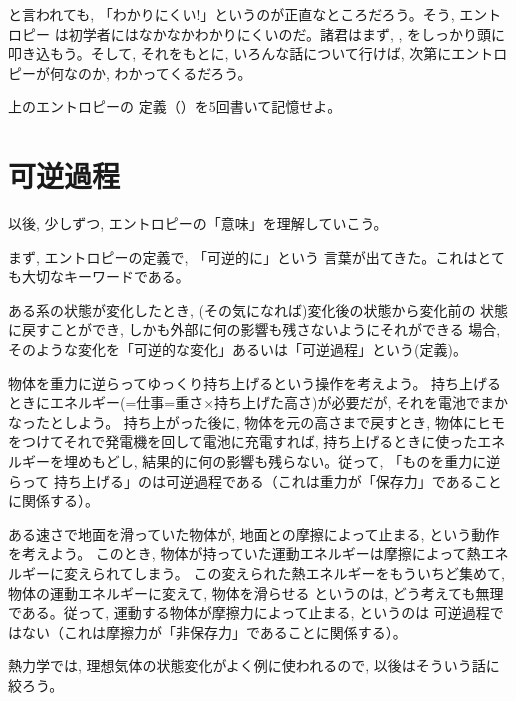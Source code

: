 と言われても, 「わかりにくい!」というのが正直なところだろう。そう, エントロピー
は初学者にはなかなかわかりにくいのだ。諸君はまず, , 
をしっかり頭に叩き込もう。そして, それをもとに, いろんな話について行けば, 
次第にエントロピーが何なのか, わかってくるだろう。
\hv

\begin{q}\label{q:def_enthalpy} 上のエントロピーの
定義（）を5回書いて記憶せよ。\end{q}\mv


\section{可逆過程}

以後, 少しずつ, エントロピーの「意味」を理解していこう。

まず, エントロピーの定義で, 「可逆的に」という
言葉が出てきた。これはとても大切なキーワードである。

ある系の状態が変化したとき, (その気になれば)変化後の状態から変化前の
状態に戻すことができ, しかも外部に何の影響も残さないようにそれができる
場合, そのような変化を「可逆的な変化」あるいは「可逆過程」という(定義)。

\begin{exmpl}\label{exmpl:lift_reverse} 物体を重力に逆らってゆっくり持ち上げるという操作を考えよう。
持ち上げるときにエネルギー(=仕事=重さ×持ち上げた高さ)が必要だが, それを電池でまかなったとしよう。
持ち上がった後に, 物体を元の高さまで戻すとき, 物体にヒモをつけてそれで発電機を回して電池に充電すれば, 
持ち上げるときに使ったエネルギーを埋めもどし, 結果的に何の影響も残らない。従って, 「ものを重力に逆らって
持ち上げる」のは可逆過程である（これは重力が「保存力」であることに関係する）。\end{exmpl}

\begin{exmpl} ある速さで地面を滑っていた物体が, 地面との摩擦によって止まる, という動作を考えよう。
このとき, 物体が持っていた運動エネルギーは摩擦によって熱エネルギーに変えられてしまう。
この変えられた熱エネルギーをもういちど集めて, 物体の運動エネルギーに変えて, 物体を滑らせる
というのは, どう考えても無理である。従って, 運動する物体が摩擦力によって止まる, というのは
可逆過程ではない（これは摩擦力が「非保存力」であることに関係する）。\end{exmpl}

熱力学では, 理想気体の状態変化がよく例に使われるので, 以後はそういう話に絞ろう。\\

